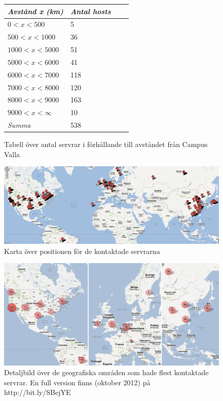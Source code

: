 \documentclass[a4paper]{article}
\begin{document}
\begin{figure}
    \centering
    \begin{tabular}{ | l | l | l | p{5cm} |}
    \hline
    \emph{Avstånd x (km)} & \emph{Antal hosts} \\ \hline
        $0 < x < 500$ & 5 \\ \hline
        $500 < x < 1000$ & 36 \\ \hline
        $1000 < x < 5000$ & 51 \\ \hline
        $5000 < x < 6000$ & 41 \\ \hline
        $6000 < x < 7000$ & 118 \\ \hline
        $7000 < x < 8000$ & 120 \\ \hline
        $8000 < x < 9000$ & 163 \\ \hline
        $9000 < x < \infty$ & 10 \\ \hline
        \hline
        \emph{Summa} & 538 \\ \hline
    \end{tabular}
    \caption{Tabell över antal servrar i förhållande till avståndet från Campus Valla}
    \label{tab:distances}
\end{figure}

\begin{figure}
    \centering
    \includegraphics[keepaspectratio,width=\textwidth]{map}
    \caption{Karta över positionen för de kontaktade servrarna}
    \label{fig:map}
\end{figure}

\begin{figure}
    \centering
    \includegraphics[keepaspectratio,width=\textwidth]{detailmap}
    \caption{Detaljbild över de geografiska områden som hade flest kontaktade servrar. En full version finns (oktober 2012) på http://bit.ly/SBejYE}
    \label{fig:detailmap}
\end{figure}
\end{document}
